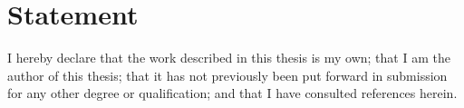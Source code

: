 \chapter*{Statement} %

I hereby declare that the work described in this thesis is my own;
that I am the author of this thesis; that it has not previously been put
forward in submission for any other degree or qualification; and that I
have consulted references herein.